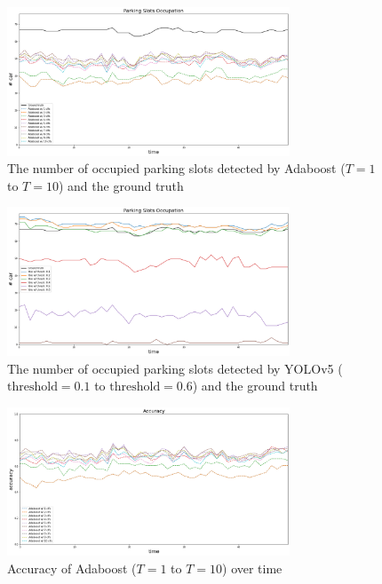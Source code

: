 \documentclass{article}[12pt]
\begin{document}
\begin{figure}[H]
    \centering
    \includegraphics[width=0.75\textwidth]{figure/Parking_Slots_Occupation_Adaboost.png}
    \caption{The number of occupied parking slots detected by Adaboost ($T=1$ to $T=10$) 
    and the ground truth}
\end{figure}

\begin{figure}[H]
    \centering
    \includegraphics[width=0.75\textwidth]{figure/Parking_Slots_Occupation_yolo.png}
    \caption{The number of occupied parking slots detected by YOLOv5 ($\text{threshold}=0.1$ 
    to $\text{threshold}=0.6$) and the ground truth}
\end{figure}

\begin{figure}[H]
    \centering
    \includegraphics[width=0.75\textwidth]{figure/Accuracy_Adaboost.png}
    \caption{Accuracy of Adaboost ($T=1$ to $T=10$) over time}
    \label{fig:acc_ada}
\end{figure}
\end{document}
